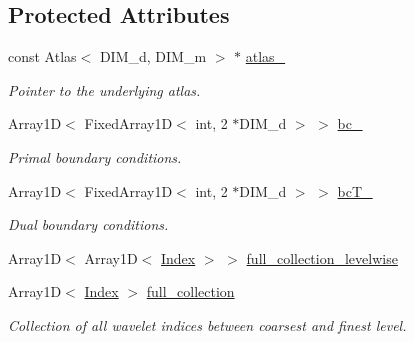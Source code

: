\subsection*{Protected Attributes}
\begin{CompactItemize}
\item 
\hypertarget{classFrameTL_1_1AggregatedFrame_fd1cef884cecf5fb9ed32f61c9f0177a}{
const Atlas$<$ DIM\_\-d, DIM\_\-m $>$ $\ast$ \hyperlink{classFrameTL_1_1AggregatedFrame_fd1cef884cecf5fb9ed32f61c9f0177a}{atlas\_\-}}
\label{classFrameTL_1_1AggregatedFrame_fd1cef884cecf5fb9ed32f61c9f0177a}

\begin{CompactList}\small\item\em Pointer to the underlying atlas. \item\end{CompactList}\item 
\hypertarget{classFrameTL_1_1AggregatedFrame_405d6414002f06c408d861fbb46ba23e}{
Array1D$<$ FixedArray1D$<$ int, 2 $\ast$DIM\_\-d $>$ $>$ \hyperlink{classFrameTL_1_1AggregatedFrame_405d6414002f06c408d861fbb46ba23e}{bc\_\-}}
\label{classFrameTL_1_1AggregatedFrame_405d6414002f06c408d861fbb46ba23e}

\begin{CompactList}\small\item\em Primal boundary conditions. \item\end{CompactList}\item 
\hypertarget{classFrameTL_1_1AggregatedFrame_be92c570fec801bbce9b38d28a9592dd}{
Array1D$<$ FixedArray1D$<$ int, 2 $\ast$DIM\_\-d $>$ $>$ \hyperlink{classFrameTL_1_1AggregatedFrame_be92c570fec801bbce9b38d28a9592dd}{bcT\_\-}}
\label{classFrameTL_1_1AggregatedFrame_be92c570fec801bbce9b38d28a9592dd}

\begin{CompactList}\small\item\em Dual boundary conditions. \item\end{CompactList}\item 
Array1D$<$ Array1D$<$ \hyperlink{classFrameTL_1_1FrameIndex}{Index} $>$ $>$ \hyperlink{classFrameTL_1_1AggregatedFrame_71d04f538cfd359189ed4898712c54b0}{full\_\-collection\_\-levelwise}
\item 
\hypertarget{classFrameTL_1_1AggregatedFrame_313890332cb2c5db9fb6d0964dedb005}{
Array1D$<$ \hyperlink{classFrameTL_1_1FrameIndex}{Index} $>$ \hyperlink{classFrameTL_1_1AggregatedFrame_313890332cb2c5db9fb6d0964dedb005}{full\_\-collection}}
\label{classFrameTL_1_1AggregatedFrame_313890332cb2c5db9fb6d0964dedb005}

\begin{CompactList}\small\item\em Collection of all wavelet indices between coarsest and finest level. \item\end{CompactList}\end{CompactItemize}
